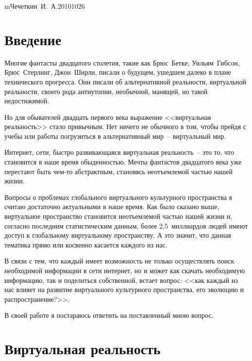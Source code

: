 


    {m}{Чечеткин~И.~А.}{20101026}
  \onehalfspacing
  \setcounter{page}{2}
  \tableofcontents

  \newpage

  \section*{Введение}
  
  Многие фантасты двадцатого столетия, такие как Брюс~Бетке, Уильям~Гибсон,
  Брюс~Стерлинг, Джон~Ширли, писали о будущем, ушедшем далеко в плане
  технического прогресса. Они писали об альтернативной реальности, виртуальной
  реальности, своего рода антиутопии, необычной, манящей, но такой недостижимой.
  
	Но для обывателей двадцать первого века выражение <<виртуальная реальность>>
	стало привычным. Нет ничего не обычного в том, чтобы прейдя с учебы или работы
	погрузиться в альтернативный мир~-- виртуальный мир.
	
	Интернет, сети, быстро развивающаяся виртуальная реальность~-- это то, что
	становится в наше время обыденностью. Мечты фантастов двадцатого века уже
	перестают быть чем-то абстрактным, становясь неотъемлемой частью нашей жизни.
	
	Вопросы о проблемах глобального виртуального культурного пространства я считаю
	достаточно актуальными в наше время. Как было сказано выше, виртуальное
	пространство становится неотъемлемой частью нашей жизни и, согласно последним
	статистическим данным, более 2,5~миллиардов людей имеют доступ к глобальному
	виртуальному пространству. А это значит, что данная тематика прямо или
	косвенно касается каждого из нас.
	
	В связи с тем, что каждый имеет возможность не только осуществлять поиск
	необходимой информации в сети интернет, но и может как скачать необходимую
	информацию, так и поделиться собственной, встает вопрос: <<как каждый из нас
	влияет на развитие виртуального культурного пространства, его эволюцию и
	распространение?>>.
	
	В своей работе я постараюсь ответить на поставленный мною вопрос. 

  \section{Виртуальная реальность}
